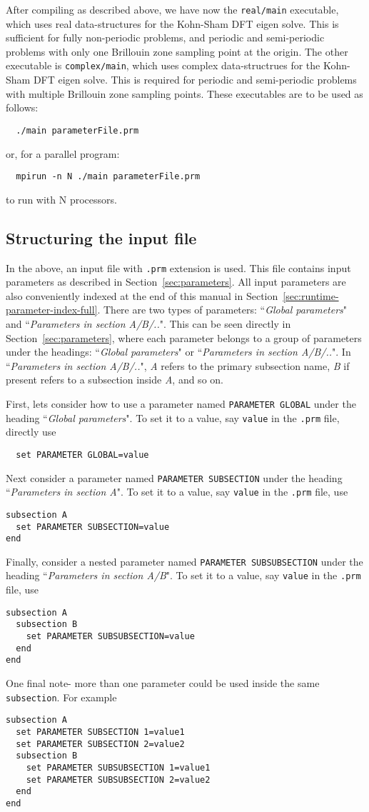 After compiling \dftfe{} as described above, we have now the \verb|real/main| executable, which uses real data-structures for the Kohn-Sham DFT eigen solve. This is sufficient for fully non-periodic problems, and periodic and semi-periodic problems with only one Brillouin zone sampling point at the origin. The other executable is \verb|complex/main|, which uses complex data-structrues for the Kohn-Sham DFT eigen solve. This is required for periodic and semi-periodic problems with multiple Brillouin zone sampling points. These executables are to be used as follows:
\begin{verbatim}
  ./main parameterFile.prm
\end{verbatim}
or, for a parallel program:
\begin{verbatim}
  mpirun -n N ./main parameterFile.prm
\end{verbatim}
to run with N processors. 
\subsection{Structuring the input file}
In the above, an input file with \verb|.prm| extension is used. This file contains input parameters as described in Section~\ref{sec:parameters}. All input parameters are also conveniently indexed at the end of this manual in Section~\ref{sec:runtime-parameter-index-full}. There are two types of parameters: ``{\it Global parameters}" and ``{\it Parameters in section A/B/..}". This can be seen directly in Section~\ref{sec:parameters}, where each parameter belongs to a group of parameters under the headings: ``{\it Global parameters}" or ``{\it Parameters in section A/B/..}". In ``{\it Parameters in section A/B/..}", {\it A} refers to the primary subsection name, {\it B} if present refers to a subsection inside {\it A}, and so on. 

First, lets consider how to use a parameter named \verb|PARAMETER GLOBAL| under the heading ``{\it Global parameters}". To set it to a value, say \verb|value|  in the  \verb|.prm| file, directly use
\begin{verbatim}
  set PARAMETER GLOBAL=value
\end{verbatim}
Next consider a parameter named \verb|PARAMETER SUBSECTION| under the heading ``{\it Parameters in section A}". To set it to a value, say \verb|value|  in the  \verb|.prm| file, use 
\begin{verbatim}
subsection A
  set PARAMETER SUBSECTION=value
end
\end{verbatim}
Finally, consider a nested parameter named  \verb|PARAMETER SUBSUBSECTION| under the heading ``{\it Parameters in section A/B}". To set it to a value, say \verb|value|  in the  \verb|.prm| file, use 
\begin{verbatim}
subsection A
  subsection B
    set PARAMETER SUBSUBSECTION=value
  end
end
\end{verbatim}
One final note- more than one parameter could be used inside the same \verb|subsection|. For example
\begin{verbatim}
subsection A
  set PARAMETER SUBSECTION 1=value1
  set PARAMETER SUBSECTION 2=value2
  subsection B
    set PARAMETER SUBSUBSECTION 1=value1
    set PARAMETER SUBSUBSECTION 2=value2
  end
end
\end{verbatim}
